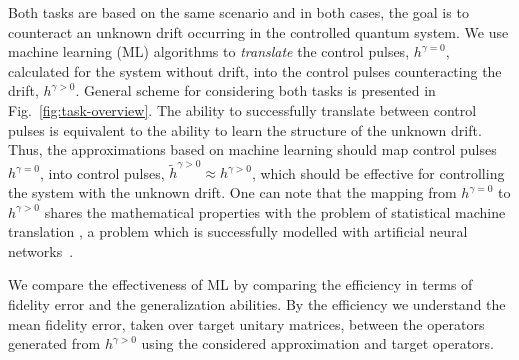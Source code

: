\documentclass[aps,pra,showkeys,showpacs,notitlepage,superscriptaddress]{revtex4-1}
\newcommand{\1}{{\rm 1\hspace{-0.9mm}l}}
\newcommand{\NCP}{\ensuremath{h^{\gamma=0}}\xspace}
\newcommand{\DCP}{\ensuremath{h^{\gamma >0}}\xspace}
\newcommand{\nnDCP}{\ensuremath{\tilde{h}^{\gamma >0}}\xspace}
\begin{document}
Both tasks are based on the same scenario and in both cases, the goal is to
counteract an unknown drift occurring in the controlled quantum system.  We use
machine learning (ML) algorithms to \emph{translate} the control pulses,
$\NCP$, calculated for the system without drift, into the control pulses
counteracting the drift, $\DCP$. General scheme for considering both tasks is
presented in Fig.~\ref{fig:task-overview}. The ability to successfully translate
between control pulses is equivalent to the ability to learn the structure of
the unknown drift. Thus, the approximations based on machine learning should map
control pulses $\NCP$, into control pulses, $\nnDCP \approx \DCP$, which should be effective
for controlling the system with the unknown drift. One can note that the mapping from \NCP to \DCP shares the mathematical properties 
with the problem of statistical machine translation \cite{koehn2009statistical}, a problem which is 
successfully modelled with artificial neural networks~\cite{bahdanau2014neural}. 

We compare the effectiveness
of ML by comparing the efficiency in terms of fidelity error and the generalization abilities.  By the efficiency we understand the mean fidelity error, taken over target unitary matrices, between the operators generated from \DCP using the considered approximation and target operators. 
\end{document}
